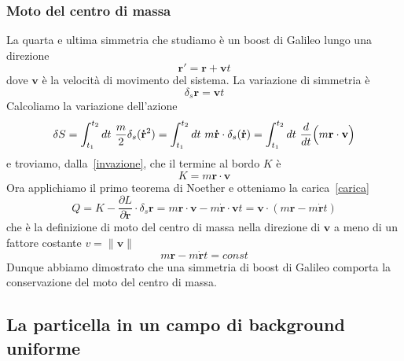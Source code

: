 \begin{example}
    \subsubsection{Moto del centro di massa}
        La quarta e ultima simmetria che studiamo è un boost di Galileo lungo una direzione
    \begin{equation}
        \mathbf r' = \mathbf r + \mathbf v t
    \end{equation}
        dove $\mathbf v$ è la velocità di movimento del sistema. La variazione di simmetria è 
    \begin{equation*}
        \delta_s \mathbf r = \mathbf v t
    \end{equation*}
        Calcoliamo la variazione dell'azione
    \begin{equation}
        \delta S = \int_{t_1}^{t_2}dt~ \frac{m}{2} \delta_s (\mathbf{\dot r}^2) = \int_{t_1}^{t_2}dt~ m \mathbf {\dot r} \cdot \delta_s (\mathbf{\dot r})= \int_{t_1}^{t_2}dt~ \frac{d}{dt} \Big( m \mathbf r \cdot \mathbf v \Big) 
    \end{equation}
        e troviamo, dalla~\eqref{invazione}, che il termine al bordo $K$ è 
    \begin{equation*}
        K = m \mathbf r \cdot \mathbf v 
    \end{equation*}
        Ora applichiamo il primo teorema di Noether e otteniamo la carica~\eqref{carica} 
    \begin{equation}
        Q = K - \frac{\partial L}{\partial \mathbf{\dot r}} \cdot \delta_s \mathbf r =  m \mathbf r \cdot \mathbf v - m \mathbf{\dot r} \cdot \mathbf v t = \mathbf v \cdot (m \mathbf r - m \mathbf{\dot r} t)
    \end{equation}
        che è la definizione di moto del centro di massa nella direzione di $\mathbf v$ a meno di un fattore costante $v = \|\mathbf v \|$
    \begin{equation*}
        m \mathbf r - m \mathbf{\dot r} t = const
    \end{equation*}
        Dunque abbiamo dimostrato che una simmetria di boost di Galileo comporta la conservazione del moto del centro di massa.

    \end{example}

\subsection{La particella in un campo di background uniforme}

